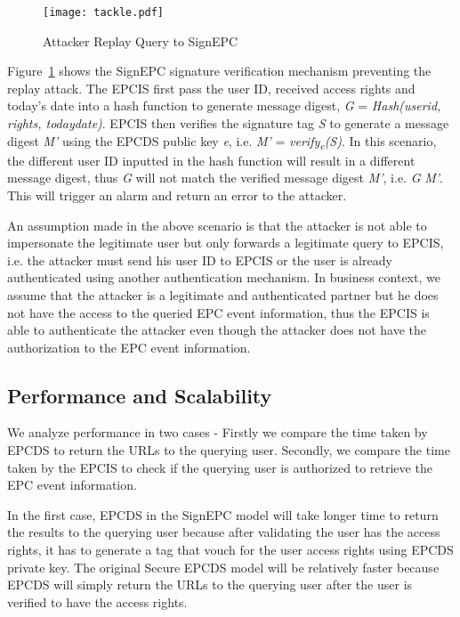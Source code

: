 \documentclass[conference]{IEEEtran}
\begin{document}
\begin{figure}[h]
\begin{center}
\texttt{[image: tackle.pdf]}
\caption{Attacker Replay Query to SignEPC \label{fig:tackle}}
\end{center}
\end{figure}

Figure~\ref{fig:tackle} shows the SignEPC signature verification mechanism preventing the replay attack. The EPCIS first pass the user ID, received access rights and today's date into a hash function to generate message digest, \emph{G} = \emph{Hash(userid, rights, todaydate)}. EPCIS then verifies the signature tag \emph{S} to generate a message digest \emph{M'} using the EPCDS public key \emph{e}, i.e. \emph{M'} = \emph{verify\textsubscript{e}(S)}.  In this scenario, the different user ID inputted in the hash function will result in a different message digest, thus \emph{G} will not match the verified message digest \emph{M'}, i.e. \emph{G}  \emph{M'}. This will trigger an alarm and return an error to the attacker.

An assumption made in the above scenario is that the attacker is not able to impersonate the legitimate user but only forwards a legitimate query to EPCIS, i.e. the attacker must send his user ID to EPCIS or the user is already authenticated using another authentication mechanism. In business context, we assume that the attacker is a legitimate and authenticated partner but he does not have the access to the queried EPC event information, thus the EPCIS is able to authenticate the attacker even though the attacker does not have the authorization to the EPC event information. 

\subsection {Performance and Scalability}
We analyze performance in two cases - Firstly we compare the time taken by EPCDS to return the URLs to the querying user. Secondly, we compare the time taken by the EPCIS to check if the querying user is authorized to retrieve the EPC event information. 

In the first case, EPCDS in the SignEPC model will take longer time to return the results to the querying user because after validating the user has the access rights, it has to generate a tag that vouch for the user access rights using EPCDS private key. The original Secure EPCDS model will be relatively faster because EPCDS will simply return the URLs to the querying user after the user is verified to have the access rights.
\end{document}
